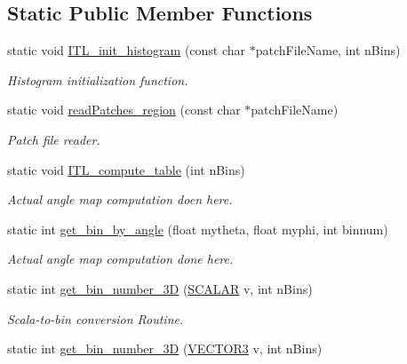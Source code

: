 \subsection*{Static Public Member Functions}
\begin{DoxyCompactItemize}
\item 
static void \hyperlink{classITL__histogram_a249b31d421d1568bd0e3e217e861582e}{ITL\_\-init\_\-histogram} (const char $\ast$patchFileName, int nBins)
\begin{DoxyCompactList}\small\item\em Histogram initialization function. \item\end{DoxyCompactList}\item 
static void \hyperlink{classITL__histogram_a2e5cd6212ddb7688ec647cce780da882}{readPatches\_\-region} (const char $\ast$patchFileName)
\begin{DoxyCompactList}\small\item\em Patch file reader. \item\end{DoxyCompactList}\item 
static void \hyperlink{classITL__histogram_a766a51e4f00bdbca0147a824295a42a3}{ITL\_\-compute\_\-table} (int nBins)
\begin{DoxyCompactList}\small\item\em Actual angle map computation doen here. \item\end{DoxyCompactList}\item 
static int \hyperlink{classITL__histogram_a0f3a4726fd8f77aec337c2097d43a533}{get\_\-bin\_\-by\_\-angle} (float mytheta, float myphi, int binnum)
\begin{DoxyCompactList}\small\item\em Actual angle map computation done here. \item\end{DoxyCompactList}\item 
static int \hyperlink{classITL__histogram_a2c91f7397774c26ba629c8e6cb0e9e85}{get\_\-bin\_\-number\_\-3D} (\hyperlink{ITL__vectormatrix_8h_ac78944183bdabdd5ba8374baabe2ef85}{SCALAR} v, int nBins)
\begin{DoxyCompactList}\small\item\em Scala-\/to-\/bin conversion Routine. \item\end{DoxyCompactList}\item 
static int \hyperlink{classITL__histogram_a18c5da3a4545be422d7b33c0dd1d0594}{get\_\-bin\_\-number\_\-3D} (\hyperlink{classVECTOR3}{VECTOR3} v, int nBins)

\end{DoxyCompactItemize}
